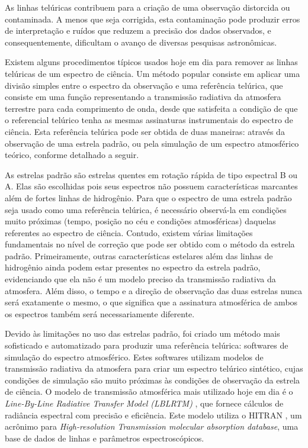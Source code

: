 As linhas telúricas  contribuem para a criação de uma observação distorcida ou contaminada. A menos que seja corrigida, esta contaminação pode produzir erros de interpretação e ruídos que reduzem a precisão dos dados observados, e consequentemente, dificultam o avanço de diversas pesquisas astronômicas.

Existem alguns procedimentos típicos usados hoje em dia para remover as linhas telúricas de um espectro de ciência. Um método popular consiste em aplicar uma divisão simples entre o espectro da observação e uma referência telúrica, que consiste em uma função representando a transmissão radiativa da atmosfera terrestre para cada comprimento de onda, desde que satisfeita a condição de que o referencial telúrico tenha as mesmas assinaturas instrumentais do espectro de ciência. Esta referência telúrica pode ser obtida de duas maneiras: através da observação de uma estrela padrão, ou pela simulação de um espectro atmosférico teórico, conforme detalhado a seguir.

As estrelas padrão são estrelas quentes em rotação rápida de tipo espectral B ou A. Elas são escolhidas pois seus espectros não possuem características marcantes além de fortes linhas de hidrogênio. Para que o espectro de uma estrela padrão seja usado como uma referência telúrica, é necessário observá-la em condições muito próximas (tempo, posição no céu e condições atmosféricas) daquelas referentes ao espectro de ciência. Contudo, existem várias limitações fundamentais no nível de correção que pode ser obtido com o método da estrela padrão. Primeiramente, outras características estelares além das linhas de hidrogênio ainda podem estar presentes no espectro da estrela padrão, evidenciando que ela não é um modelo preciso da transmissão radiativa da atmosfera. Além disso, o tempo e a direção de observação das duas estrelas nunca será exatamente o mesmo, o que significa que a assinatura atmosférica de ambos os espectros também será necessariamente diferente.

Devido às limitações no uso das estrelas padrão, foi criado um método mais sofisticado e automatizado para produzir uma referência telúrica: softwares de simulação do espectro atmosférico. Estes softwares utilizam modelos de transmissão radiativa da atmosfera para criar um espectro telúrico sintético, cujas condições de simulação são muito próximas às condições de observação da estrela de ciência. O modelo de transmissão atmosférica mais utilizado hoje em dia é o \textit{Line-By-Line Radiative Transfer Model (LBLRTM)} \citep{2005JQSRT..91..233C}, que fornece cálculos de radiância espectral com precisão e eficiência. Este modelo utiliza o HITRAN \citep{rothman2009hitran}, um acrônimo para \textit{High-resolution Transmission molecular absorption database}, uma base de dados de linhas e parâmetros espectroscópicos. 

